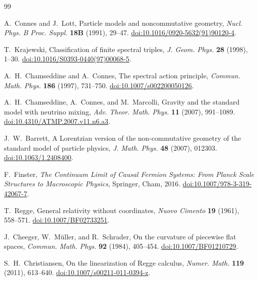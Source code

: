 \documentclass[11pt]{article}
\numberwithin{equation}{section}
\theoremstyle{definition}
\theoremstyle{remark}
\begin{document}
\clearpage
\begin{thebibliography}{99}
\small
\setlength{\itemsep}{2pt}

A.~Connes and J.~Lott,
Particle models and noncommutative geometry,
\emph{Nucl. Phys. B Proc. Suppl.} \textbf{18B} (1991), 29--47.
\href{https://doi.org/10.1016/0920-5632(91)90120-4}{doi:10.1016/0920-5632(91)90120-4}.

T.~Krajewski,
Classification of finite spectral triples,
\emph{J. Geom. Phys.} \textbf{28} (1998), 1--30.
\href{https://doi.org/10.1016/S0393-0440(97)00068-5}{doi:10.1016/S0393-0440(97)00068-5}.

A.~H.~Chamseddine and A.~Connes,
The spectral action principle,
\emph{Commun. Math. Phys.} \textbf{186} (1997), 731--750.
\href{https://doi.org/10.1007/s002200050126}{doi:10.1007/s002200050126}.

A.~H.~Chamseddine, A.~Connes, and M.~Marcolli,
Gravity and the standard model with neutrino mixing,
\emph{Adv. Theor. Math. Phys.} \textbf{11} (2007), 991--1089.
\href{https://doi.org/10.4310/ATMP.2007.v11.n6.a3}{doi:10.4310/ATMP.2007.v11.n6.a3}.

J.~W.~Barrett,
A Lorentzian version of the non-commutative geometry of the standard model of particle physics,
\emph{J. Math. Phys.} \textbf{48} (2007), 012303.
\href{https://doi.org/10.1063/1.2408400}{doi:10.1063/1.2408400}.

F.~Finster,
\emph{The Continuum Limit of Causal Fermion Systems:
From Planck Scale Structures to Macroscopic Physics},
Springer, Cham, 2016.
\href{https://doi.org/10.1007/978-3-319-42067-7}{doi:10.1007/978-3-319-42067-7}.

T.~Regge,
General relativity without coordinates,
\emph{Nuovo Cimento} \textbf{19} (1961), 558--571.
\href{https://doi.org/10.1007/BF02733251}{doi:10.1007/BF02733251}.

J.~Cheeger, W.~M\"uller, and R.~Schrader,
On the curvature of piecewise flat spaces,
\emph{Commun. Math. Phys.} \textbf{92} (1984), 405--454.
\href{https://doi.org/10.1007/BF01210729}{doi:10.1007/BF01210729}.

S.~H.~Christiansen,
On the linearization of Regge calculus,
\emph{Numer. Math.} \textbf{119} (2011), 613--640.
\href{https://doi.org/10.1007/s00211-011-0394-z}{doi:10.1007/s00211-011-0394-z}.


\end{thebibliography}
\end{document}
